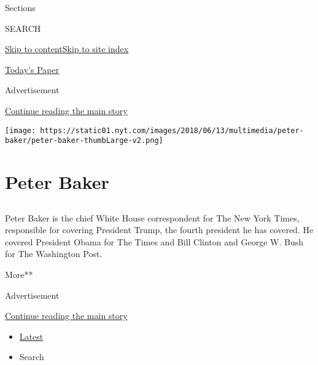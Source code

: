 Sections

SEARCH

\protect\hyperlink{site-content}{Skip to
content}\protect\hyperlink{site-index}{Skip to site index}

\href{https://myaccount.nytimes.com/auth/login?response_type=cookie\&client_id=vi}{}

\href{https://www.nytimes.com/section/todayspaper}{Today's Paper}

Advertisement

\protect\hyperlink{after-top}{Continue reading the main story}

\texttt{[image: https://static01.nyt.com/images/2018/06/13/multimedia/peter-baker/peter-baker-thumbLarge-v2.png]}

\hypertarget{peter-baker}{%
\section{Peter Baker}\label{peter-baker}}

\hypertarget{section}{%
\subsection{}\label{section}}

Peter Baker is the chief White House correspondent for The New York
Times, responsible for covering President Trump, the fourth president he
has covered. He covered President Obama for The Times and Bill Clinton
and George W. Bush for The Washington Post.

More**

Advertisement

\protect\hyperlink{after-mid1}{Continue reading the main story}

\begin{itemize}
\tightlist
\item
  \protect\hyperlink{stream-panel}{Latest}
\item
  Search
\end{itemize}

